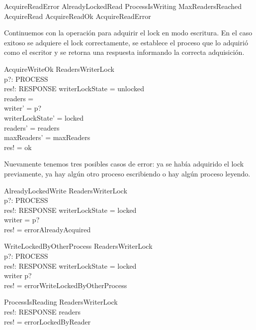 \documentclass[a4paper, 12pt]{article}
\begin{document}
\begin{zed}
AcquireReadError  AlreadyLockedRead \lor ProcessIsWriting \lor MaxReadersReached  
\also
AcquireRead  AcquireReadOk \lor AcquireReadError 
\end{zed}

Continuemos con la operación para adquirir el lock en modo escritura. En el caso exitoso se adquiere el lock correctamente, se establece el proceso que lo adquirió como el escritor y se retorna una respuesta informando la correcta adquisición. 

\begin{schema}{AcquireWriteOk}
    \Delta ReadersWriterLock \\
    p?: PROCESS \\
    res!: RESPONSE
\where
    writerLockState = unlocked \\
    readers = \emptyset \\
    writer' = p? \\
    writerLockState' = locked \\
    readers' = readers \\
    maxReaders' = maxReaders \\
    res! = ok
\end{schema}

Nuevamente tenemos tres posibles casos de error: ya se había adquirido el lock previamente, ya hay algún otro proceso escribiendo o hay algún proceso leyendo.

\begin{schema}{AlreadyLockedWrite}
    \Xi ReadersWriterLock \\
    p?: PROCESS \\
    res!: RESPONSE
\where
    writerLockState = locked \\
    writer = p? \\
    res! = errorAlreadyAcquired
\end{schema}

\begin{schema}{WriteLockedByOtherProcess}
    \Xi ReadersWriterLock \\
    p?: PROCESS \\
    res!: RESPONSE
\where
    writerLockState = locked \\
    writer \neq p? \\
    res! = errorWriteLockedByOtherProcess
\end{schema}

\begin{schema}{ProcessIsReading}
    \Xi ReadersWriterLock \\
    res!: RESPONSE
\where
    readers \neq \emptyset \\
    res! = errorLockedByReader
\end{schema}
\end{document}
